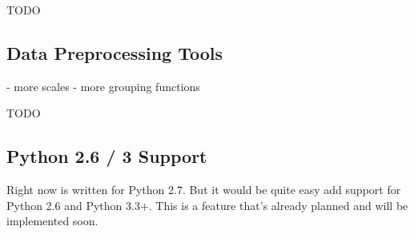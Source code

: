 TODO

\subsection{Data Preprocessing Tools}

- more scales
- more grouping functions

TODO

\subsection{Python 2.6 / 3 Support}

Right now \tangible{} is written for Python 2.7. But it would be quite easy add
support for Python 2.6 and Python 3.3+. This is a feature that's already planned
and will be implemented soon.


